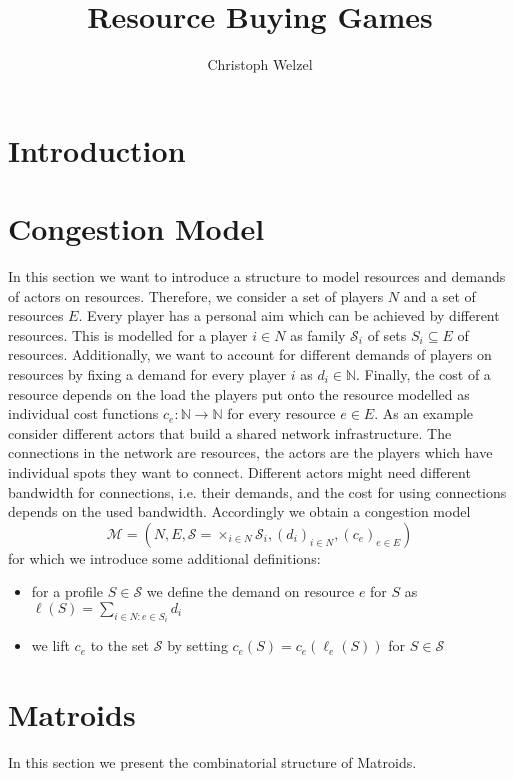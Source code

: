 \documentclass{scrartcl}
\title{Resource Buying Games}
\author{Christoph Welzel}
\theoremstyle{nonumberplain}
\newcommand{\tupel}[1]{\left(#1\right)}
\begin{document}

\maketitle
\section{Introduction}

\section{Congestion Model}
In this section we want to introduce a structure to model resources and demands
of actors on resources. Therefore, we consider a set of players $N$ and a set
of resources $E$. Every player has a personal aim which can be achieved by
different resources. This is modelled for a player $i\in N$ as family
$\mathcal{S}_{i}$ of sets $S_{i}\subseteq E$ of resources. Additionally, we
want to account for different demands of players on resources by fixing a
demand for every player $i$ as $d_{i}\in\mathbb{N}$. Finally, the cost of a
resource depends on the load the players put onto the resource modelled as
individual cost functions $c_{e}:\mathbb{N}\rightarrow \mathbb{N}$ for every
resource $e\in E$. As an example consider different actors that build a shared
network infrastructure. The connections in the network are resources, the
actors are the players which have individual spots they want to connect.
Different actors might need different bandwidth for connections, i.e. their
demands, and the cost for using connections depends on the used bandwidth.
Accordingly we obtain a congestion model
\begin{equation*}
  \mathcal{M} = \tupel{N, E, \mathcal{S} = \times_{i\in N}\mathcal{S}_{i},
  (d_{i})_{i\in N}, (c_{e})_{e\in E}}
\end{equation*}
for which we introduce some additional definitions:
\begin{itemize}
  \item for a profile $S\in\mathcal{S}$ we define
    the demand on resource $e$ for $S$ as
    $\ell(S) = \sum_{i\in N:e\in S_{i}}d_{i}$
  \item we lift $c_{e}$ to the set $\mathcal{S}$ by setting
    $c_{e}(S) = c_{e}(\ell_{e}(S))$ for $S\in\mathcal{S}$
\end{itemize}

\section{Matroids}
In this section we present the combinatorial structure of Matroids.
\end{document}
